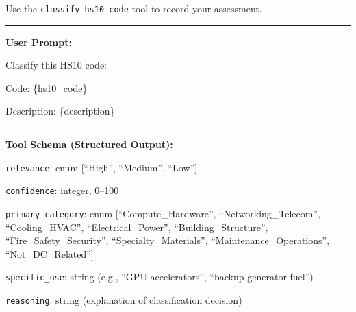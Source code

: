 \documentclass[12pt,pdftex]{article}
\newenvironment{prompt}{\par\medskip\noindent}{\par\medskip}
\begin{document}
\begin{onehalfspacing}
\begin{prompt}
\medskip

Use the \texttt{classify\_hs10\_code} tool to record your assessment.

\bigskip
\hrule
\bigskip

\textbf{User Prompt:}

\medskip

Classify this HS10 code:

Code: \{hs10\_code\}

Description: \{description\}

\bigskip
\hrule
\bigskip

\textbf{Tool Schema (Structured Output):}

\medskip

\texttt{relevance}: enum [``High'', ``Medium'', ``Low'']

\texttt{confidence}: integer, 0--100

\texttt{primary\_category}: enum [``Compute\_Hardware'', ``Networking\_Telecom'', ``Cooling\_HVAC'', ``Electrical\_Power'', ``Building\_Structure'', ``Fire\_Safety\_Security'', ``Specialty\_Materials'', ``Maintenance\_Operations'', ``Not\_DC\_Related'']

\texttt{specific\_use}: string (e.g., ``GPU accelerators'', ``backup generator fuel'')

\texttt{reasoning}: string (explanation of classification decision)

\end{prompt}

\newpage

\clearpage


\clearpage





\end{onehalfspacing}
\end{document}
